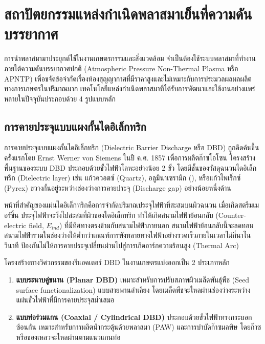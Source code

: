 \clearpage


\section{สถาปัตยกรรมแหล่งกำเนิดพลาสมาเย็นที่ความดันบรรยากาศ}

การนำพลาสมามาประยุกต์ใช้ในงานเกษตรกรรมและสิ่งแวดล้อม จำเป็นต้องใช้ระบบพลาสมาที่ทำงานภายใต้ความดันบรรยากาศปกติ (Atmospheric Pressure Non-Thermal Plasma หรือ APNTP) เพื่อขจัดข้อจำกัดเรื่องห้องสุญญากาศที่มีราคาสูงและไม่เหมาะกับการประมวลผลผลผลิตทางการเกษตรในปริมาณมาก เทคโนโลยีแหล่งกำเนิดพลาสมาที่ได้รับการพัฒนาและใช้งานอย่างแพร่หลายในปัจจุบันประกอบด้วย 4 รูปแบบหลัก

\subsection{การคายประจุแบบแผงกั้นไดอิเล็กทริก}

การคายประจุแบบแผงกั้นไดอิเล็กทริก (Dielectric Barrier Discharge หรือ DBD) ถูกคิดค้นขึ้นครั้งแรกโดย Ernst Werner von Siemens ในปี ค.ศ. 1857 เพื่อการผลิตก๊าซโอโซน โครงสร้างพื้นฐานของระบบ DBD ประกอบด้วยขั้วไฟฟ้าโลหะอย่างน้อย 2 ขั้ว โดยมีชั้นของวัสดุฉนวนไดอิเล็กทริก (Dielectric layer) เช่น แก้วควอตซ์ (Quartz), อลูมินาเซรามิก (), หรือแก้วไพเร็กซ์ (Pyrex) ขวางกั้นอยู่ระหว่างช่องว่างการคายประจุ (Discharge gap) อย่างน้อยหนึ่งด้าน

หน้าที่สำคัญของแผ่นไดอิเล็กทริกคือการจำกัดปริมาณประจุไฟฟ้าที่สะสมบนผิวฉนวน เมื่อเกิดสตรีมเมอร์ขึ้น ประจุไฟฟ้าจะวิ่งไปสะสมที่ผิวของไดอิเล็กทริก ทำให้เกิดสนามไฟฟ้าย้อนกลับ (Counter-electric field, $E_{ind}$) ที่มีทิศทางตรงข้ามกับสนามไฟฟ้าภายนอก สนามไฟฟ้าย้อนกลับนี้จะลดทอนสนามไฟฟ้ารวมในช่องว่างให้ต่ำกว่าเกณฑ์การพังทลายทางไฟฟ้าอย่างรวดเร็วภายในเวลาไม่กี่นาโนวินาที ป้องกันไม่ให้การคายประจุเปลี่ยนผ่านไปสู่การเกิดอาร์กความร้อนสูง (Thermal Arc)

โครงสร้างทางวิศวกรรมของรีแอคเตอร์ DBD ในงานเกษตรแบ่งออกเป็น 2 ประเภทหลัก
\begin{enumerate}
    \item \textbf{แบบระนาบคู่ขนาน (Planar DBD)} เหมาะสำหรับการปรับสภาพผิวเมล็ดพันธุ์พืช (Seed surface functionalization) แบบสายพานลำเลียง โดยเมล็ดพืชจะไหลผ่านช่องว่างระหว่างแผ่นขั้วไฟฟ้าที่มีการคายประจุสม่ำเสมอ
    \item \textbf{แบบท่อร่วมแกน (Coaxial / Cylindrical DBD)} ประกอบด้วยขั้วไฟฟ้าทรงกระบอกซ้อนกัน เหมาะสำหรับการผลิตน้ำกระตุ้นด้วยพลาสมา (PAW) และการบำบัดก๊าซมลพิษ โดยก๊าซหรือของเหลวจะไหลผ่านตามแนวแกนท่อ
\end{enumerate}

